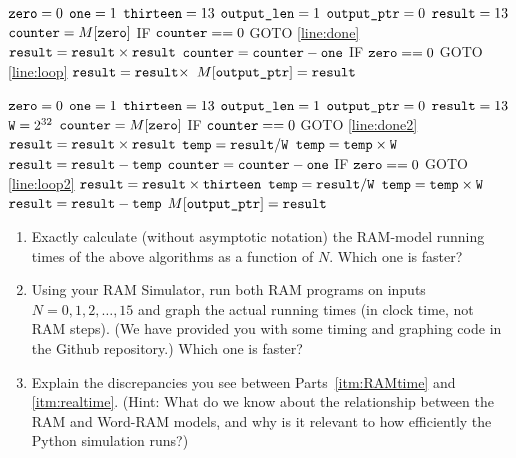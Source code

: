 \documentclass[11pt]{article}
\begin{document}
\begin{enumerate}
\begin{algorithm}[H]
\setcounter{AlgoLine}{-1}
$\texttt{zero} = 0$\;
$\texttt{one} = 1$\;
$\texttt{thirteen} = 13$\;
$\texttt{output\_len} = 1$\;
$\texttt{output\_ptr} = 0$\;
$\texttt{result} = 13$\;
$\texttt{counter} = M[\texttt{zero}]$\;
\Indp
 IF $\texttt{counter} == 0$ GOTO \ref{line:done}\; \label{line:loop}
$\texttt{result} = \texttt{result} \times \texttt{result}$\;
$\texttt{counter} = \texttt{counter} - \texttt{one}$\;
IF $\texttt{zero} == 0$ GOTO \ref{line:loop}\;
\Indm
$\texttt{result} = \texttt{result} \times $\thirteen\; \label{line:done}
$M[\texttt{output\_ptr}]=\texttt{result}$\;
\end{algorithm}

\begin{algorithm}[H]
\setcounter{AlgoLine}{-1}
$\texttt{zero} = 0$\;
$\texttt{one} = 1$\;
$\texttt{thirteen} = 13$\;
$\texttt{output\_len} = 1$\;
$\texttt{output\_ptr} = 0$\;
$\texttt{result} = 13$\;
$\texttt{W} = 2^{32}$\;
$\texttt{counter} = M[\texttt{zero}]$\;
\Indp
IF $\texttt{counter} == 0$ GOTO \ref{line:done2}\; \label{line:loop2}
$\texttt{result} = \texttt{result} \times \texttt{result}$\;
$\texttt{temp} = \texttt{result} / \texttt{W}$\;
$\texttt{temp} = \texttt{temp} \times \texttt{W}$\;
$\texttt{result} = \texttt{result} - \texttt{temp}$\;
$\texttt{counter} = \texttt{counter} - \texttt{one}$\;
IF $\texttt{zero} == 0$ GOTO \ref{line:loop2}\;
\Indm
$\texttt{result} = \texttt{result} \times \texttt{thirteen}$\;
\label{line:done2}
$\texttt{temp} = \texttt{result} / \texttt{W}$\;
$\texttt{temp} = \texttt{temp} \times \texttt{W}$\;
$\texttt{result} = \texttt{result} - \texttt{temp}$\;
$M[\texttt{output\_ptr}]=\texttt{result}$\; 
\end{algorithm}

\begin{enumerate}
    \item Exactly calculate (without asymptotic notation) the RAM-model running times of the above algorithms as a function of $N$.
    Which one is faster? \label{itm:RAMtime}    
    \item Using your RAM Simulator, run both RAM programs on inputs $N=0,1,2,\ldots,15$ and graph the actual running times (in clock time, not RAM steps).  (We have provided you with some timing and graphing code in the Github repository.) Which one is faster?  \label{itm:realtime}  
    
    \item Explain the discrepancies you see between Parts~\ref{itm:RAMtime} and \ref{itm:realtime}.  (Hint: What do we know about the relationship between the RAM and Word-RAM models, and why is it relevant to how efficiently the Python simulation runs?) 
    

\end{enumerate}
\end{enumerate}
\end{document}
